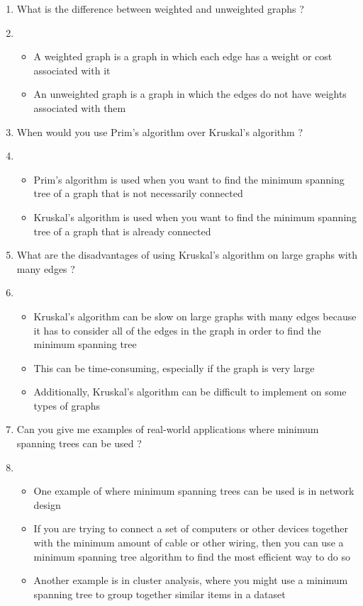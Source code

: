 ﻿\documentclass{article}
\newcommand{\answer}{\item [$\rightarrow$]}
\begin{document}
\begin{enumerate}[label=\arabic*. ]
		\item What is the difference between weighted and unweighted graphs ?
		\answer
			\begin{itemize}[label=$\ast$]
				\item A weighted graph is a graph in which each edge has a weight or cost associated
					with it
				\item An unweighted graph is a graph in which the edges do not have weights associated
					with them
			\end{itemize}

		\item When would you use Prim's algorithm over Kruskal's algorithm ?
		\answer
			\begin{itemize}[label=$\ast$]
				\item Prim's algorithm is used when you want to find the minimum spanning tree of a
					graph that is not necessarily connected
				\item Kruskal's algorithm is used when you want to find the minimum spanning tree of a
					graph that is already connected
			\end{itemize}

		\item What are the disadvantages of using Kruskal's algorithm on large graphs with many edges ?
		\answer
			\begin{itemize}[label=$\ast$]
				\item Kruskal's algorithm can be slow on large graphs with many edges because it has to
					consider all of the edges in the graph in order to find the minimum spanning
					tree
				\item This can be time-consuming, especially if the graph is very large
				\item Additionally, Kruskal's algorithm can be difficult to implement on some types of
					graphs
			\end{itemize}

		\item Can you give me examples of real-world applications where minimum spanning trees can be used ?
		\answer
			\begin{itemize}[label=$\ast$]

				\item One example of where minimum spanning trees can be used is in network design
				\item If you are trying to connect a set of computers or other devices together with the
					minimum amount of cable or other wiring, then you can use a minimum spanning
					tree algorithm to find the most efficient way to do so
				\item Another example is in cluster analysis, where you might use a minimum spanning
					tree to group together similar items in a dataset
			\end{itemize}
	\end{enumerate} \newpage
\end{document}
